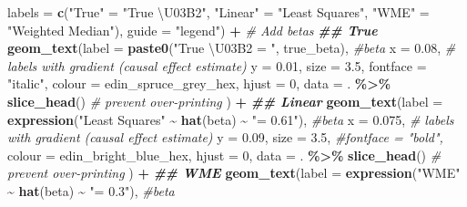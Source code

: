 \documentclass[
]{article}
\newenvironment{Shaded}{\begin{snugshade}}{\end{snugshade}}
\newcommand{\AttributeTok}[1]{\textcolor[rgb]{0.13,0.29,0.53}{#1}}
\newcommand{\CommentTok}[1]{\textcolor[rgb]{0.56,0.35,0.01}{\textit{#1}}}
\newcommand{\DecValTok}[1]{\textcolor[rgb]{0.00,0.00,0.81}{#1}}
\newcommand{\DocumentationTok}[1]{\textcolor[rgb]{0.56,0.35,0.01}{\textbf{\textit{#1}}}}
\newcommand{\FloatTok}[1]{\textcolor[rgb]{0.00,0.00,0.81}{#1}}
\newcommand{\FunctionTok}[1]{\textcolor[rgb]{0.13,0.29,0.53}{\textbf{#1}}}
\newcommand{\NormalTok}[1]{#1}
\newcommand{\OtherTok}[1]{\textcolor[rgb]{0.56,0.35,0.01}{#1}}
\newcommand{\SpecialCharTok}[1]{\textcolor[rgb]{0.81,0.36,0.00}{\textbf{#1}}}
\newcommand{\StringTok}[1]{\textcolor[rgb]{0.31,0.60,0.02}{#1}}
\begin{document}
\begin{Shaded}
\begin{Highlighting}[]
                      \AttributeTok{labels =} \FunctionTok{c}\NormalTok{(}\StringTok{"True"} \OtherTok{=} \StringTok{"True \textbackslash{}U03B2"}\NormalTok{, }
                                 \StringTok{"Linear"} \OtherTok{=} \StringTok{"Least Squares"}\NormalTok{,}
                                 \StringTok{"WME"} \OtherTok{=} \StringTok{"Weighted Median"}\NormalTok{),}
                      \AttributeTok{guide =} \StringTok{"legend"}\NormalTok{) }\SpecialCharTok{+}
  \CommentTok{\# Add betas}
  \DocumentationTok{\#\# True}
  \FunctionTok{geom\_text}\NormalTok{(}\AttributeTok{label =} \FunctionTok{paste0}\NormalTok{(}\StringTok{"True \textbackslash{}U03B2 = "}\NormalTok{, true\_beta), }\CommentTok{\#beta}
            \AttributeTok{x =} \FloatTok{0.08}\NormalTok{, }\CommentTok{\# labels with gradient (causal effect estimate)}
            \AttributeTok{y =} \FloatTok{0.01}\NormalTok{,}
            \AttributeTok{size =} \FloatTok{3.5}\NormalTok{, }
            \AttributeTok{fontface =} \StringTok{"italic"}\NormalTok{,}
            \AttributeTok{colour =}\NormalTok{ edin\_spruce\_grey\_hex, }
            \AttributeTok{hjust =} \DecValTok{0}\NormalTok{, }
            \AttributeTok{data =}\NormalTok{ . }\SpecialCharTok{\%\textgreater{}\%} \FunctionTok{slice\_head}\NormalTok{() }\CommentTok{\# prevent over{-}printing}
\NormalTok{  ) }\SpecialCharTok{+}
  \DocumentationTok{\#\# Linear}
  \FunctionTok{geom\_text}\NormalTok{(}\AttributeTok{label =} \FunctionTok{expression}\NormalTok{(}\StringTok{"Least Squares"} \SpecialCharTok{\textasciitilde{}} \FunctionTok{hat}\NormalTok{(beta) }\SpecialCharTok{\textasciitilde{}} \StringTok{"= 0.61"}\NormalTok{), }\CommentTok{\#beta}
            \AttributeTok{x =} \FloatTok{0.075}\NormalTok{, }\CommentTok{\# labels with gradient (causal effect estimate)}
            \AttributeTok{y =} \FloatTok{0.09}\NormalTok{,}
            \AttributeTok{size =} \FloatTok{3.5}\NormalTok{, }
            \CommentTok{\#fontface = "bold",}
            \AttributeTok{colour =}\NormalTok{ edin\_bright\_blue\_hex, }
            \AttributeTok{hjust =} \DecValTok{0}\NormalTok{, }
            \AttributeTok{data =}\NormalTok{ . }\SpecialCharTok{\%\textgreater{}\%} \FunctionTok{slice\_head}\NormalTok{() }\CommentTok{\# prevent over{-}printing}
\NormalTok{  ) }\SpecialCharTok{+}
  \DocumentationTok{\#\# WME}
  \FunctionTok{geom\_text}\NormalTok{(}\AttributeTok{label =} \FunctionTok{expression}\NormalTok{(}\StringTok{"WME"} \SpecialCharTok{\textasciitilde{}} \FunctionTok{hat}\NormalTok{(beta) }\SpecialCharTok{\textasciitilde{}} \StringTok{"= 0.3"}\NormalTok{), }\CommentTok{\#beta}

\end{Highlighting}
\end{Shaded}
\end{document}
